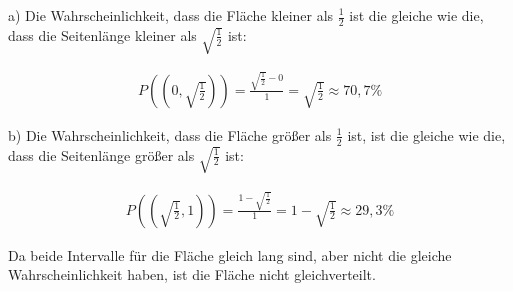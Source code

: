 \documentclass[11pt,a4paper]{article}
\begin{document}
  a) Die Wahrscheinlichkeit, dass die Fläche kleiner als $\frac{1}{2}$ ist die gleiche wie die, dass die Seitenlänge kleiner als $\sqrt{\frac{1}{2}}$ ist:

  \begin{align*}
    P((0,\sqrt{\frac{1}{2}})) = \frac{\sqrt{\frac{1}{2}} - 0}{1} = \sqrt{\frac{1}{2}} \approx 70,7 \%
  \end{align*}

  b) Die Wahrscheinlichkeit, dass die Fläche größer als $\frac{1}{2}$ ist, ist die gleiche wie die, dass die Seitenlänge größer als $\sqrt{\frac{1}{2}}$ ist:

  \begin{align*}
    P((\sqrt{\frac{1}{2}},1)) = \frac{1 - \sqrt{\frac{1}{2}}}{1} = 1 - \sqrt{\frac{1}{2}} \approx 29,3 \%
  \end{align*}

  Da beide Intervalle für die Fläche gleich lang sind, aber nicht die gleiche Wahrscheinlichkeit haben, ist die Fläche nicht gleichverteilt.
\end{document}
